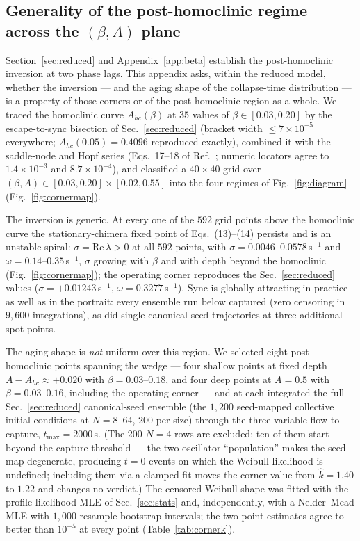 \documentclass[pdflatex,sn-mathphys,Numbered]{sn-jnl}
\begin{document}
\begin{appendices}
\section{Generality of the post-homoclinic regime across the $(\beta, A)$ plane}\label{app:corner}

Section~\ref{sec:reduced} and Appendix~\ref{app:beta} establish the
post-homoclinic inversion at two phase lags. This appendix asks, within the
reduced model, whether the inversion --- and the aging shape of the collapse-time
distribution --- is a property of those corners or of the post-homoclinic region
as a whole. We traced the homoclinic curve $A_{hc}(\beta)$ at $35$ values of
$\beta \in [0.03, 0.20]$ by the escape-to-sync bisection of
Sec.~\ref{sec:reduced} (bracket width $\le 7\times10^{-5}$ everywhere;
$A_{hc}(0.05) = 0.4096$ reproduced exactly), combined it with the saddle-node
and Hopf series (Eqs.~17--18 of Ref.~\cite{abrams2008}; numeric locators agree
to $1.4\times10^{-3}$ and $8.7\times10^{-4}$), and classified a $40\times40$
grid over $(\beta, A) \in [0.03, 0.20] \times [0.02, 0.55]$ into the four
regimes of Fig.~\ref{fig:diagram} (Fig.~\ref{fig:cornermap}).

The inversion is generic. At every one of the $592$ grid points above the
homoclinic curve the stationary-chimera fixed point of Eqs.~(13)--(14) persists
and is an unstable spiral: $\sigma = \mathrm{Re}\,\lambda > 0$ at all $592$
points, with $\sigma = 0.0046$--$0.0578$\,s$^{-1}$ and
$\omega = 0.14$--$0.35$\,s$^{-1}$, $\sigma$ growing with $\beta$ and with depth
beyond the homoclinic (Fig.~\ref{fig:cornermap}); the operating corner
reproduces the Sec.~\ref{sec:reduced} values
($\sigma = +0.01243$\,s$^{-1}$, $\omega = 0.3277$\,s$^{-1}$). Sync is globally
attracting in practice as well as in the portrait: every ensemble run below
captured (zero censoring in $9{,}600$ integrations), as did single
canonical-seed trajectories at three additional spot points.

The aging shape is \emph{not} uniform over this region. We selected eight
post-homoclinic points spanning the wedge --- four shallow points at fixed depth
$A - A_{hc} \approx +0.020$ with $\beta = 0.03$--$0.18$, and four deep points at
$A = 0.5$ with $\beta = 0.03$--$0.16$, including the operating corner --- and at
each integrated the full Sec.~\ref{sec:reduced} canonical-seed ensemble (the
$1{,}200$ seed-mapped collective initial conditions at $N = 8$--$64$, $200$ per
size) through the three-variable flow to capture, $t_{\max} = 2000$\,s. (The
$200$ $N = 4$ rows are excluded: ten of them start beyond the capture threshold
--- the two-oscillator ``population'' makes the seed map degenerate, producing
$t = 0$ events on which the Weibull likelihood is undefined; including them via
a clamped fit moves the corner value from $\hat k = 1.40$ to $1.22$ and changes
no verdict.) The censored-Weibull shape was fitted with the
profile-likelihood MLE of Sec.~\ref{sec:stats} and, independently, with a
Nelder--Mead MLE with $1{,}000$-resample bootstrap intervals; the two point
estimates agree to better than $10^{-5}$ at every point
(Table~\ref{tab:cornerk}).


\end{appendices}
\end{document}
